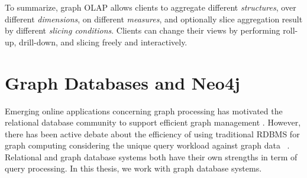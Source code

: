 To summarize, graph OLAP allows clients to aggregate different \textit{structures}, over different \textit{dimensions}, on different \textit{measures}, and optionally slice aggregation result by different \textit{slicing conditions}. Clients can change their views by performing roll-up, drill-down, and slicing freely and interactively.


\section{Graph Databases and Neo4j}
Emerging online applications concerning graph processing has motivated the relational database community to support efficient graph management \cite{DBLP:conf/grades/Xirogiannopoulos17} \cite{DBLP:conf/bigdataconf/JindalMCH15}. However, there has been active debate about the efficiency of using traditional RDBMS for graph computing considering the unique query workload against graph data~\cite{DBLP:conf/edbt/HolschSG17} \cite{DBLP:journals/corr/JoishiS17}. Relational and graph database systems both have their own strengths in term of query processing. In this thesis, we work with graph database systems.


